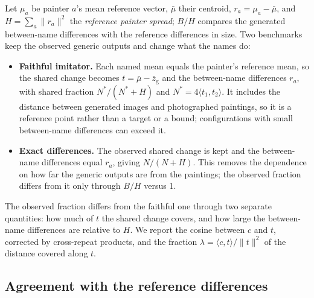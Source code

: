 \documentclass[10pt]{article}
\newcommand{\ip}[2]{\langle #1,#2\rangle}
\begin{document}
Let $\mu_a$ be painter $a$'s mean reference vector, $\bar\mu$ their centroid, $r_a=\mu_a-\bar\mu$,
and $H=\sum_a\|r_a\|^2$ the \emph{reference painter spread}; $B/H$ compares the generated
between-name differences with the reference differences in size. Two benchmarks keep the observed
generic outputs and change what the names do:
\begin{itemize}
\item \textbf{Faithful imitator.} Each named mean equals the painter's reference mean, so the
shared change becomes $t=\bar\mu-\bar z_{\mathrm{g}}$ and the between-name differences $r_a$, with
shared fraction $N^*/(N^*+H)$ and $N^*=4\ip{t_1}{t_2}$. It includes the distance between generated
images and photographed paintings, so it is a reference point rather than a target or a bound;
configurations with small between-name differences can exceed it.
\item \textbf{Exact differences.} The observed shared change is kept and the between-name
differences equal $r_a$, giving $N/(N+H)$. This removes the dependence on how far the generic
outputs are from the paintings; the observed fraction differs from it only through $B/H$
versus 1.
\end{itemize}
The observed fraction differs from the faithful one through two separate quantities: how much of
$t$ the shared change covers, and how large the between-name differences are relative to $H$.
We report the cosine between $c$ and $t$, corrected by cross-repeat products, and the fraction
$\lambda=\ip{c}{t}/\|t\|^2$ of the distance covered along $t$.

\subsection{Agreement with the reference differences}\label{sec:agreement-method}
\end{document}
